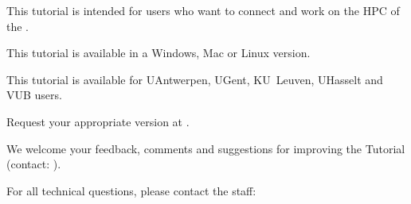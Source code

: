 This tutorial is intended for users who want to connect and work on the HPC of the \strong{\university}.

This tutorial is available in a Windows, Mac or Linux version.

This tutorial is available for UAntwerpen, UGent, KU~Leuven, UHasselt and VUB users.

Request your appropriate version at \hpcinfo.


We welcome your feedback, comments and suggestions for improving the \hpc
Tutorial  (contact: \hpcinfo).

For all technical questions, please contact the \hpc staff:

